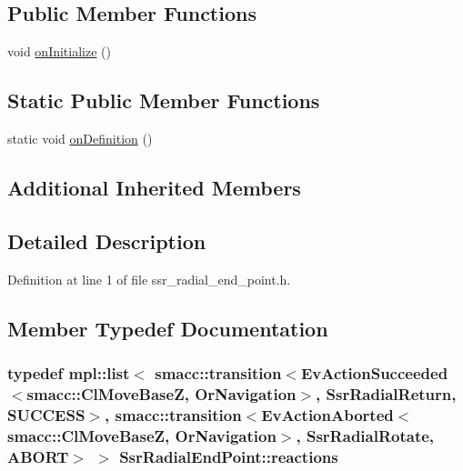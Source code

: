 \subsection*{Public Member Functions}
\begin{DoxyCompactItemize}
\item 
void \hyperlink{structSsrRadialEndPoint_a193b193a7a831dcdf586686c0c309f73}{on\+Initialize} ()
\end{DoxyCompactItemize}
\subsection*{Static Public Member Functions}
\begin{DoxyCompactItemize}
\item 
static void \hyperlink{structSsrRadialEndPoint_a99cb9ca368254cff94843a32d791bd6c}{on\+Definition} ()
\end{DoxyCompactItemize}
\subsection*{Additional Inherited Members}


\subsection{Detailed Description}


Definition at line 1 of file ssr\+\_\+radial\+\_\+end\+\_\+point.\+h.



\subsection{Member Typedef Documentation}
\subsubsection[{\texorpdfstring{reactions}{reactions}}]{\setlength{\rightskip}{0pt plus 5cm}typedef mpl\+::list$<$ {\bf smacc\+::transition}$<$Ev\+Action\+Succeeded$<${\bf smacc\+::\+Cl\+Move\+BaseZ}, Or\+Navigation$>$, {\bf Ssr\+Radial\+Return}, {\bf S\+U\+C\+C\+E\+SS}$>$, {\bf smacc\+::transition}$<$Ev\+Action\+Aborted$<${\bf smacc\+::\+Cl\+Move\+BaseZ}, Or\+Navigation$>$, {\bf Ssr\+Radial\+Rotate}, {\bf A\+B\+O\+RT}$>$ $>$ {\bf Ssr\+Radial\+End\+Point\+::reactions}}\hypertarget{structSsrRadialEndPoint_ae5df9b6ac600ded3e01032e784941959}{}\label{structSsrRadialEndPoint_ae5df9b6ac600ded3e01032e784941959}


